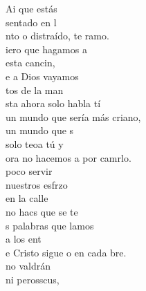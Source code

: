 \documentclass[12pt]{article}
\begin{document}
 
    \sffamily

    \portada[titulo=Cantoral, subtitulo=Grupo San Francisco]
    \newpage
    \tableofcontents
    \newpage


    \begin{multicols*}{2}
    
\begin{cancion}%
	Ai que estás \\
	sentado en l     \\
	nto o distraído, te ramo.\\
	iero que hagamos a \\
	esta cancin,\\
	e a Dios vayamos \\
	tos de la man\\
\jump
	sta ahora solo habla tí\\
	un mundo que sería más criano,\\
	 un mundo que s  \\
	solo teoa tú y \\
	ora no hacemos a por camrlo.\\
\jump
	 poco servir \\
	nuestros esfrzo\\
	en la calle \\
	no hacs que se te\\
	s palabras que lamos \\
	a los ent\\
	e Cristo sigue o en cada bre.\\
\jump
	 no valdrán \\
	ni perosscus, \\

\end{cancion}
\end{multicols*}
\end{document}
